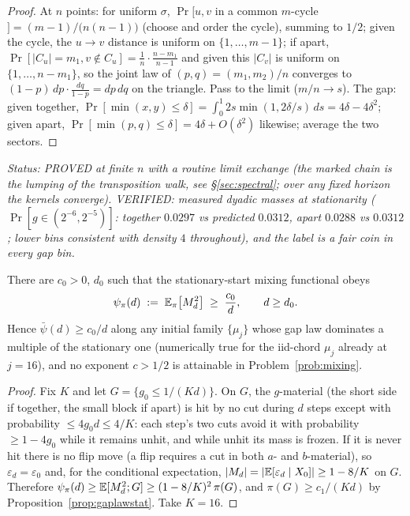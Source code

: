 \begin{proof}
At $n$ points: for uniform $\sigma$, $\Pr[u,v$ in a common $m$-cycle$]
=(m-1)/\bigl(n(n-1)\bigr)$ (choose and order the cycle), summing to
$1/2$; given the cycle, the $u\to v$ distance is uniform on
$\{1,\dots,m-1\}$; if apart,
$\Pr[|C_u|=m_1,v\notin C_u]=\tfrac1n\cdot\tfrac{n-m_1}{n-1}$ and
given this $|C_v|$ is uniform on $\{1,\dots,n-m_1\}$, so the joint
law of $(p,q)=(m_1,m_2)/n$ converges to
$(1-p)\,dp\cdot\tfrac{dq}{1-p}=dp\,dq$ on the triangle.  Pass to the
limit ($m/n\to s$).  The
gap: given together,
$\Pr[\min(x,y)\le\delta]=\int_0^1 2s\min(1,2\delta/s)\,ds
=4\delta-4\delta^2$; given apart,
$\Pr[\min(p,q)\le\delta]=4\delta+O(\delta^2)$ likewise; average the
two sectors.
\end{proof}

\emph{Status: PROVED at finite $n$ with a routine limit exchange
(the marked chain is the lumping of the transposition walk, see
\S\ref{sec:spectral}; over any fixed horizon the kernels converge).
VERIFIED: measured dyadic masses at stationarity
($\Pr[g\in(2^{-6},2^{-5})]$: together $0.0297$ vs predicted $0.0312$,
apart $0.0288$ vs $0.0312$; lower bins consistent with density $4$
throughout), and the label is a fair coin in every gap bin.}

\begin{proposition}
\label{prop:lower}
There are $c_0>0$, $d_0$ such that the stationary-start mixing
functional obeys
\[
\psi_\pi(d)\;:=\;\mathbb{E}_\pi\bigl[M_d^2\bigr]\;\ge\;\frac{c_0}{d},
\qquad d\ge d_0 .
\]
Hence $\bar\psi(d)\ge c_0/d$ along any initial family
$\{\mu_j\}$ whose gap law dominates a multiple of the stationary one
(numerically true for the iid-chord $\mu_j$ already at $j=16$), and
no exponent $c>1/2$ is attainable in Problem~\ref{prob:mixing}.
\end{proposition}

\begin{proof}
Fix $K$ and let
$G=\{g_0\le1/(Kd)\}$.  On $G$, the $g$-material (the short side if
together, the small block if apart) is hit by no cut during $d$ steps
except with probability $\le 4g_0d\le4/K$: each step's two cuts avoid
it with probability $\ge1-4g_0$ while it remains unhit, and while
unhit its mass is frozen.  If it is never hit there is no flip move
(a flip requires a cut in both $a$- and $b$-material), so
$\varepsilon_d=\varepsilon_0$ and, for the conditional expectation,
$|M_d|=|\mathbb{E}[\varepsilon_d\mid X_0]|\ge1-8/K$ on $G$.  Therefore
$\psi_\pi(d)\ge\mathbb{E}[M_d^2;G]\ge(1-8/K)^2\,\pi(G)$, and
$\pi(G)\ge c_1/(Kd)$ by Proposition~\ref{prop:gaplawstat}.  Take
$K=16$.
\end{proof}

